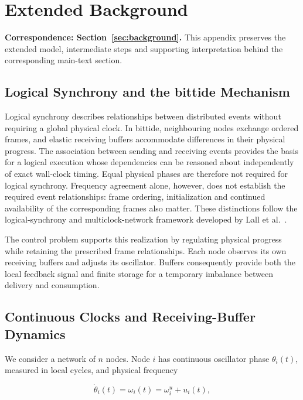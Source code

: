 \section{Extended Background}
\label{app:background}
\noindent\textbf{Correspondence: Section~\ref{sec:background}.} This appendix preserves the extended model, intermediate steps and supporting interpretation behind the corresponding main-text section.


\label{detail:sec:background}

\subsection{Logical Synchrony and the bittide Mechanism}

Logical synchrony describes relationships between distributed events without requiring a global physical clock. In bittide, neighbouring nodes exchange ordered frames, and elastic receiving buffers accommodate differences in their physical progress. The association between sending and receiving events provides the basis for a logical execution whose dependencies can be reasoned about independently of exact wall-clock timing. Equal physical phases are therefore not required for logical synchrony. Frequency agreement alone, however, does not establish the required event relationships: frame ordering, initialization and continued availability of the corresponding frames also matter. These distinctions follow the logical-synchrony and multiclock-network framework developed by Lall et al.~\cite{lall2024logicalSynchrony}.

The control problem supports this realization by regulating physical progress while retaining the prescribed frame relationships. Each node observes its own receiving buffers and adjusts its oscillator. Buffers consequently provide both the local feedback signal and finite storage for a temporary imbalance between delivery and consumption.

\subsection{Continuous Clocks and Receiving-Buffer Dynamics}

We consider a network of $n$ nodes. Node $i$ has continuous oscillator phase $\theta_i(t)$, measured in local cycles, and physical frequency

\begin{equation}
\dot\theta_i(t)=\omega_i(t)=\omega_i^u+u_i(t),
\end{equation}


